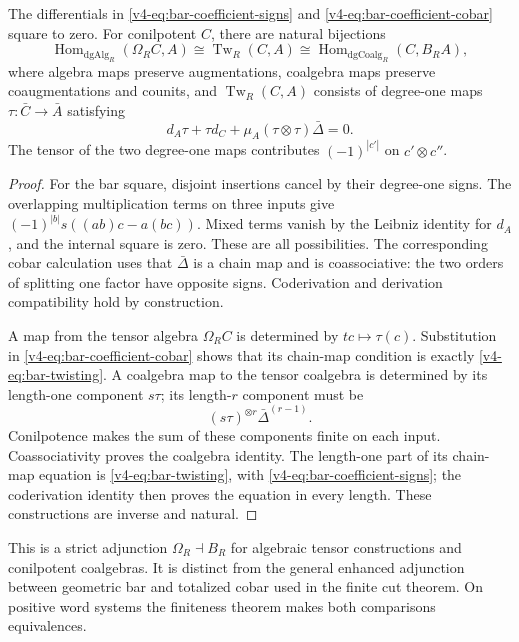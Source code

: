 \begin{proposition}\label{v4-prop:bar-coefficient-identities}
The differentials in \eqref{v4-eq:bar-coefficient-signs} and
\eqref{v4-eq:bar-coefficient-cobar} square to zero. For conilpotent
\(C\), there are natural bijections
\[
 \operatorname{Hom}_{\mathrm{dgAlg}_R}(\Omega_R C,A)
 \cong\operatorname{Tw}_R(C,A)
 \cong\operatorname{Hom}_{\mathrm{dgCoalg}_R}(C,B_RA),
\]
where algebra maps preserve augmentations, coalgebra maps preserve
coaugmentations and counits, and \(\operatorname{Tw}_R(C,A)\)
consists of degree-one maps \(\tau:\bar C\to\bar A\) satisfying
\begin{equation}\label{v4-eq:bar-twisting}
 d_A\tau+\tau d_C+\mu_A(\tau\otimes\tau)\bar\Delta=0.
\end{equation}
The tensor of the two degree-one maps contributes
\((-1)^{|c'|}\) on \(c'\otimes c''\).
\end{proposition}

\begin{proof}
For the bar square, disjoint insertions cancel by their degree-one
signs. The overlapping multiplication terms on three inputs give
\((-1)^{|b|}s((ab)c-a(bc))\). Mixed terms vanish by the Leibniz
identity for \(d_A\), and the internal square is zero. These are
all possibilities. The corresponding cobar calculation uses that
\(\bar\Delta\) is a chain map and is coassociative: the two orders
of splitting one factor have opposite signs. Coderivation and
derivation compatibility hold by construction.

A map from the tensor algebra \(\Omega_RC\) is determined by
\(tc\mapsto\tau(c)\). Substitution in
\eqref{v4-eq:bar-coefficient-cobar} shows that its chain-map
condition is exactly \eqref{v4-eq:bar-twisting}. A coalgebra map
to the tensor coalgebra is determined by its length-one component
\(s\tau\); its length-\(r\) component must be
\[
 (s\tau)^{\otimes r}\bar\Delta^{(r-1)}.
\]
Conilpotence makes the sum of these components finite on each
input. Coassociativity proves the coalgebra identity. The
length-one part of its chain-map equation is
\eqref{v4-eq:bar-twisting}, with
\eqref{v4-eq:bar-coefficient-signs}; the coderivation identity
then proves the equation in every length. These constructions are
inverse and natural.
\end{proof}

This is a strict adjunction \(\Omega_R\dashv B_R\) for algebraic
tensor constructions and conilpotent coalgebras. It is distinct
from the general enhanced adjunction between geometric bar and
totalized cobar used in the finite cut theorem. On positive word
systems the finiteness theorem makes both comparisons equivalences.

